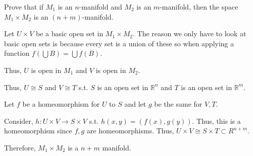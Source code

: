 \documentclass[12pt, letterpaper]{article}
\newcommand{\R}{\mathbb{R}}
\begin{document}
\begin{problem}{}
    Prove that if $M_1$ is an $n$-manifold and $M_2$ is an $m$-manifold,
  then the space $M_1 \times M_2$ is an $(n + m)$-manifold.
\end{problem}
\begin{problemproof}
    Let $U \times V$ be a basic open set in $M_1 \times M_2$. The reason we only have to look at basic open sets is because every set is a union of these so when applying a function $f(\bigcup B)=\bigcup f(B)$.

    Thus, $U$ is open in $M_1$ and $V$ is open in $M_2$.

    Thus, $U \cong S$ and $V \cong T$ s.t. $S$ is an open set in $\R^n$ and $T$ is an open set in $\R^m$.

    Let $f$ be a homeomorphism for $U$ to $S$ and let $g$ be the same for $V,T$.

    Consider, $h: U \times V \to S \times V$ s.t. $h(x,y)=(f(x),g(y))$. Thus, this is a homeomorphism since $f,g$ are homeomorphisms. Thus, $U \times V \cong S \times T \subset R^{n+m}$.

    Therefore, $M_1 \times M_2$ is a $n+m$ manifold.
\end{problemproof}
\end{document}
